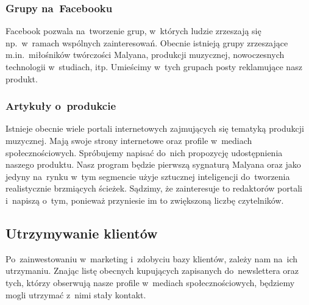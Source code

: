 \documentclass[12pt]{article}
\begin{document}
\subsubsection{Grupy na~Facebooku}

Facebook pozwala na~tworzenie grup, w~których ludzie zrzeszają się np.~w~ramach wspólnych zainteresowań.
Obecnie istnieją grupy zrzeszające m.in.~miłośników twórczości Malyana, produkcji muzycznej, nowoczesnych technologii w~studiach, itp.
Umieścimy w~tych grupach posty reklamujące nasz produkt.

\subsubsection{Artykuły o~produkcie}


Istnieje obecnie wiele portali internetowych zajmujących się tematyką produkcji muzycznej.
Mają swoje strony internetowe oraz profile w~mediach społecznościowych.
Spróbujemy napisać do~nich propozycję udostępnienia naszego produktu.
Nasz program będzie pierwszą sygnaturą Malyana oraz jako jedyny na~rynku w~tym segmencie użyje sztucznej inteligencji do~tworzenia realistycznie brzmiących ścieżek.
Sądzimy, że zainteresuje to redaktorów portali i~napiszą o~tym, ponieważ przyniesie im to zwiększoną liczbę czytelników.

\subsection{Utrzymywanie klientów}


Po~zainwestowaniu w~marketing i~zdobyciu bazy klientów, zależy nam na~ich utrzymaniu.
Znając listę obecnych kupujących zapisanych do~newslettera oraz tych, którzy obserwują nasze profile w~mediach społecznościowych, będziemy mogli utrzymać z~nimi stały kontakt.
\end{document}
